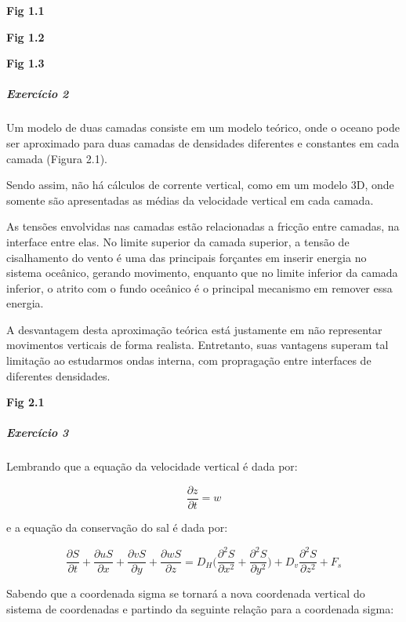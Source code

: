 \documentclass[11pt]{article}
\begin{document}
\textbf{Fig 1.1}

\textbf{Fig 1.2}

\textbf{Fig 1.3}

    \subparagraph{Exercício 2}\label{exercuxedcio-2}

Um modelo de duas camadas consiste em um modelo teórico, onde o oceano
pode ser aproximado para duas camadas de densidades diferentes e
constantes em cada camada (Figura 2.1).

Sendo assim, não há cálculos de corrente vertical, como em um modelo 3D,
onde somente são apresentadas as médias da velocidade vertical em cada
camada.

As tensões envolvidas nas camadas estão relacionadas a fricção entre
camadas, na interface entre elas. No limite superior da camada superior,
a tensão de cisalhamento do vento é uma das principais forçantes em
inserir energia no sistema oceânico, gerando movimento, enquanto que no
limite inferior da camada inferior, o atrito com o fundo oceânico é o
principal mecanismo em remover essa energia.

A desvantagem desta aproximação teórica está justamente em não
representar movimentos verticais de forma realista. Entretanto, suas
vantagens superam tal limitação ao estudarmos ondas interna, com
propragação entre interfaces de diferentes densidades.

\textbf{Fig 2.1}

    \subparagraph{Exercício 3}\label{exercuxedcio-3}

Lembrando que a equação da velocidade vertical é dada por:

\begin{equation}
    \frac{\partial{z}}{\partial{t}} = w
    \label{eq:3.1}
\end{equation}

e a equação da conservação do sal é dada por:

\begin{equation}
    \frac{\partial{S}}{\partial{t}} + \frac{\partial{uS}}{\partial{x}} + \frac{\partial{vS}}{\partial{y}} + \frac{\partial{wS}}{\partial{z}} = D_H\bigg( \frac{\partial^2{S}}{\partial{x^2}} + \frac{\partial^2{S}}{\partial{y^2}} \bigg) + D_v\frac{\partial^2{S}}{\partial{z^2}} + F_s
    \label{eq:3.2}
\end{equation}

Sabendo que a coordenada sigma se tornará a nova coordenada vertical do
sistema de coordenadas e partindo da seguinte relação para a coordenada
sigma:
\end{document}
